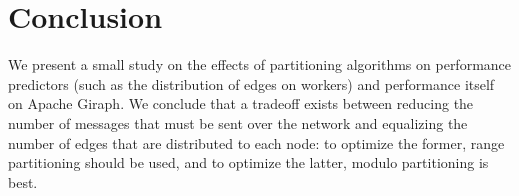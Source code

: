 \section{Conclusion}

We present a small study on the effects of partitioning algorithms on 
performance predictors (such as the distribution of edges on workers) and 
performance itself on Apache Giraph. We conclude that a tradeoff exists between 
reducing the number of messages that must be sent over the network and 
equalizing the number of edges that are distributed to each node: to optimize 
the former, range partitioning should be used, and to optimize the latter, 
modulo partitioning is best. 